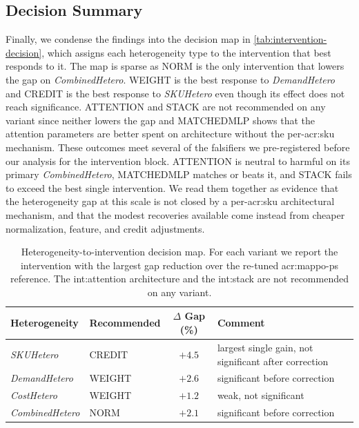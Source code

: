 \subsection{Decision Summary}
\label{subsec:decision-summary}
Finally, we condense the findings into the decision map in \autoref{tab:intervention-decision}, which assigns each heterogeneity type to the intervention that best responds to it. The map is sparse
as NORM is the only intervention that lowers the gap on \textit{CombinedHetero}. WEIGHT is the best response to \textit{DemandHetero} and CREDIT is the best response to \textit{SKUHetero} even though its
effect does not reach significance. ATTENTION and STACK are not recommended on any variant since neither lowers the
gap and MATCHEDMLP shows that the attention parameters are better
spent on architecture without the per-\gls{acr:sku} mechanism. These outcomes meet several of the falsifiers we pre-registered before our analysis for the intervention block. ATTENTION is
neutral to harmful on its primary \textit{CombinedHetero}, MATCHEDMLP matches or beats it, and STACK fails to exceed the best single intervention. We read them together as evidence that the heterogeneity gap at this scale is not closed by a per-\gls{acr:sku} architectural mechanism, and that the modest recoveries available come instead from cheaper normalization, feature, and credit adjustments.


\begin{table}[t]
\centering
\small
\renewcommand{\arraystretch}{1.2}
\caption[Heterogeneity-to-intervention decision map]{Heterogeneity-to-intervention decision map. For each variant we report the
intervention with the largest gap reduction over the re-tuned \gls{acr:mappo-ps}
reference. The \gls{int:attention} architecture and the \gls{int:stack} are not
recommended on any variant.}
\label{tab:intervention-decision}
\begin{tabular}{@{}l l c l@{}}
\toprule
\textbf{Heterogeneity} & \textbf{Recommended} & \textbf{$\Delta$ Gap (\%)} & \textbf{Comment}\\
\midrule
\textit{SKUHetero} & CREDIT & $+4.5$ & largest single gain, not significant after correction\\
\textit{DemandHetero}        & WEIGHT & $+2.6$ & significant before correction\\
\textit{CostHetero}          & WEIGHT & $+1.2$ & weak, not significant\\
\textit{CombinedHetero}      & NORM   & $+2.1$ & significant before correction\\
\bottomrule
\end{tabular}
\end{table}